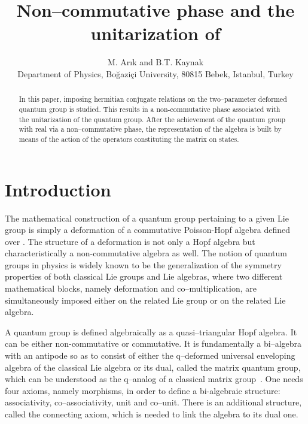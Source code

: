 \documentclass[a4paper,12pt]{article}
\numberwithin{equation}{section}
\begin{document}
\title{Non--commutative phase and the unitarization of
\coordHE{}}


\author{M. Ar\i k and B.T. Kaynak \\
{\small Department of Physics, Bo\u{g}azi\c{c}i University, 80815 Bebek, Istanbul, Turkey}}
\date{}
\maketitle

\begin{abstract}
In this paper, imposing hermitian conjugate relations on
 the two--parameter deformed quantum group \coordHE{} is studied.
This results in a non-commutative phase associated with the unitarization of the
 quantum group. After the achievement of the quantum group \coordHE{}
 with \coordHE{} real via a non--commutative phase, the representation of the algebra
 is built by means of the action of the operators constituting the
 \coordHE{} matrix on states.
\end{abstract}

\section{Introduction}\label{int}
The mathematical construction of a quantum group \coordHE{} pertaining
 to a given Lie group \coordHE{} is simply a deformation of a commutative
 Poisson-Hopf algebra defined over \coordHE{}. The structure of a deformation
 is not only a Hopf algebra but characteristically a non-commutative
 algebra as well. The notion of quantum groups in physics is widely
 known to be the generalization of the symmetry properties of both
 classical Lie groups and Lie algebras, where two different mathematical
 blocks, namely deformation and co--multiplication, are simultaneously
 imposed either on the related Lie group or on the related Lie algebra.

A quantum group is defined algebraically as a quasi--triangular Hopf algebra.
 It can be either non-commutative or commutative. It is fundamentally a
 bi--algebra with an antipode so as to consist of either the q--deformed
 universal enveloping algebra of the classical Lie algebra or its dual,
 called the matrix quantum group, which can be understood as the q--analog
 of a classical matrix group~\cite{Bie}. One needs four axioms, namely morphisms,
 in order to define a bi-algebraic structure: associativity, co--associativity, unit
 and co--unit. There is an additional structure, called the connecting axiom,
 which is needed to link the algebra to its dual one.
\end{document}
